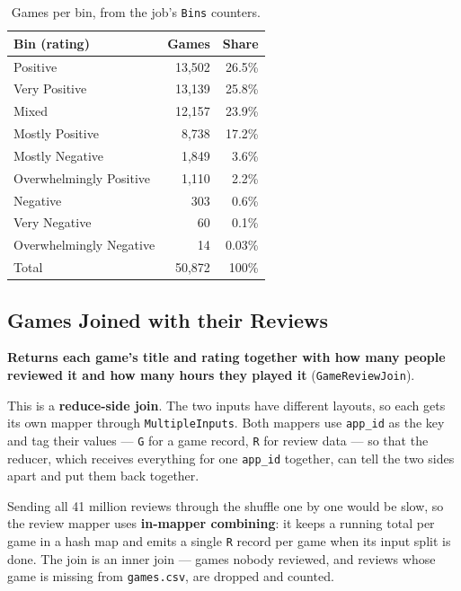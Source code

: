 \documentclass[11pt,a4paper]{article}
\newcommand{\code}[1]{\texttt{#1}}
\begin{document}
\begin{table}[H]\centering\small
\begin{tabular}{lrr}
\toprule
Bin (rating) & Games & Share \\
\midrule
Positive                & 13,502 & 26.5\% \\
Very Positive           & 13,139 & 25.8\% \\
Mixed                   & 12,157 & 23.9\% \\
Mostly Positive         &  8,738 & 17.2\% \\
Mostly Negative         &  1,849 &  3.6\% \\
Overwhelmingly Positive &  1,110 &  2.2\% \\
Negative                &    303 &  0.6\% \\
Very Negative           &     60 &  0.1\% \\
Overwhelmingly Negative &     14 &  0.03\% \\
\midrule
Total                   & 50,872 & 100\% \\
\bottomrule
\end{tabular}
\caption{Games per bin, from the job's \code{Bins} counters.}
\end{table}

\subsection{Games Joined with their Reviews}
\textbf{Returns each game's title and rating together with how many people reviewed it and how many
hours they played it} (\code{GameReviewJoin}).

This is a \textbf{reduce-side join}. The two inputs have different layouts, so each gets its own
mapper through \code{MultipleInputs}. Both mappers use \code{app\_id} as the key and tag their values —
\code{G} for a game record, \code{R} for review data — so that the reducer, which receives
everything for one \code{app\_id} together, can tell the two sides apart and put them back together.

Sending all 41 million reviews through the shuffle one by one would be slow, so the review mapper
uses \textbf{in-mapper combining}: it keeps a running total per game in a hash map and emits a single
\code{R} record per game when its input split is done. The join is an inner join — games nobody
reviewed, and reviews whose game is missing from \code{games.csv}, are dropped and counted.
\end{document}
